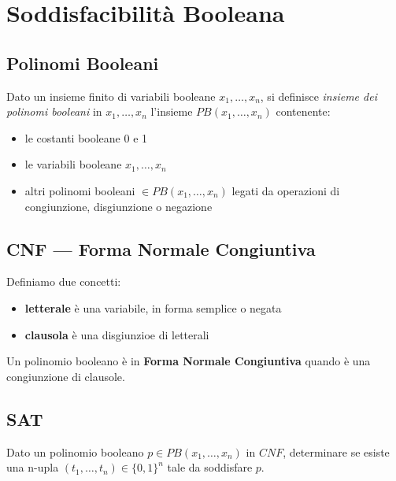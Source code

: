 \section{Soddisfacibilità Booleana}

\subsection{Polinomi Booleani}

Dato un insieme finito di variabili booleane $x_1, \ldots, x_n$, si definisce \textit{insieme dei polinomi booleani} in $x_1, \ldots, x_n$ l'insieme $PB(x_1, \ldots, x_n)$ contenente:
\begin{itemize}
	\item le costanti booleane 0 e 1
	\item le variabili booleane $x_1, \ldots, x_n$
	\item altri polinomi booleani $\in PB(x_1, \ldots, x_n)$ legati da operazioni di congiunzione, disgiunzione o negazione
\end{itemize}

\subsection{CNF --- Forma Normale Congiuntiva}

Definiamo due concetti:
\begin{itemize}
	\item \textbf{letterale} è una variabile, in forma semplice o negata
	\item \textbf{clausola} è una disgiunzioe di letterali
\end{itemize}

\vspace{0.4cm}

\begin{defn}
	Un polinomio booleano è in \textbf{Forma Normale Congiuntiva} quando è una congiunzione di clausole.
\end{defn}

\subsection{SAT}

Dato un polinomio booleano $p \in PB(x_1, \ldots, x_n)$ in $CNF$, determinare se esiste una n-upla $(t_1, \ldots, t_n) \in \{0, 1\}^n$ tale da soddisfare $p$.

\vspace{0.4cm}

